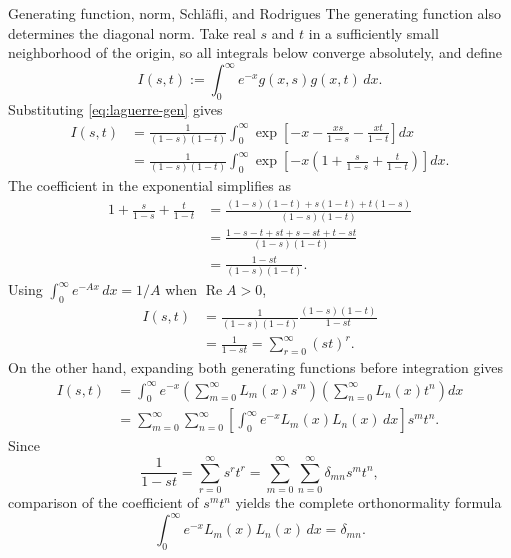 \documentclass[11pt]{beamer}
\begin{document}
\begin{frame}[allowframebreaks]{Generating function, norm, Schl\"afli, and Rodrigues}
\medskip
The generating function also determines the diagonal norm.  Take real $s$ and
$t$ in a sufficiently small neighborhood of the origin, so all integrals below
converge absolutely, and define
\[
  I(s,t)
    :=\int_0^\infty e^{-x}g(x,s)g(x,t)\,dx.
\]
Substituting \eqref{eq:laguerre-gen} gives
\begin{align*}
  I(s,t)
   &=
    \frac{1}{(1-s)(1-t)}
    \int_0^\infty
      \exp\!\left[
        -x-\frac{xs}{1-s}-\frac{xt}{1-t}
      \right]dx\\
   &=
    \frac{1}{(1-s)(1-t)}
    \int_0^\infty
      \exp\!\left[
        -x\left(
          1+\frac{s}{1-s}+\frac{t}{1-t}
        \right)
      \right]dx.
\end{align*}
The coefficient in the exponential simplifies as
\begin{align*}
  1+\frac{s}{1-s}+\frac{t}{1-t}
   &=
    \frac{(1-s)(1-t)+s(1-t)+t(1-s)}
         {(1-s)(1-t)}\\
   &=
    \frac{1-s-t+st+s-st+t-st}
         {(1-s)(1-t)}\\
   &=
    \frac{1-st}{(1-s)(1-t)}.
\end{align*}
Using $\int_0^\infty e^{-Ax}\,dx=1/A$ when $\operatorname{Re}A>0$,
\begin{align*}
  I(s,t)
   &=
    \frac{1}{(1-s)(1-t)}
    \frac{(1-s)(1-t)}{1-st}\\
   &=\frac{1}{1-st}
    =\sum_{r=0}^{\infty}(st)^r.
\end{align*}
On the other hand, expanding both generating functions before integration gives
\begin{align*}
  I(s,t)
   &=
    \int_0^\infty e^{-x}
      \left(\sum_{m=0}^{\infty}L_m(x)s^m\right)
      \left(\sum_{n=0}^{\infty}L_n(x)t^n\right)dx\\
   &=
    \sum_{m=0}^{\infty}\sum_{n=0}^{\infty}
      \left[
        \int_0^\infty e^{-x}L_m(x)L_n(x)\,dx
      \right]s^m t^n.
\end{align*}
Since
\[
  \frac{1}{1-st}
   =\sum_{r=0}^{\infty}s^rt^r
   =\sum_{m=0}^{\infty}\sum_{n=0}^{\infty}
      \delta_{mn}s^mt^n,
\]
comparison of the coefficient of $s^mt^n$ yields the complete orthonormality
formula
\begin{equation}
  \int_0^\infty e^{-x}L_m(x)L_n(x)\,dx=\delta_{mn}.
  \label{eq:laguerre-norm}
\end{equation}


\end{frame}
\end{document}
